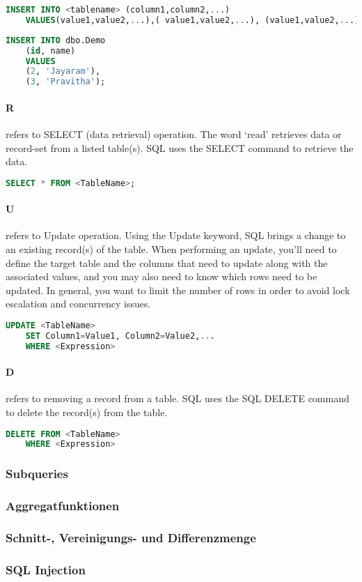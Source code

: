\begin{lstlisting}[language=SQL]
	INSERT INTO <tablename> (column1,column2,...) 
	VALUES(value1,value2,...),( value1,value2,...), (value1,value2,...)...
\end{lstlisting}

\begin{lstlisting}[language=SQL]
	INSERT INTO dbo.Demo
	(id, name)
	VALUES
	(2, 'Jayaram'),
	(3, 'Pravitha');
\end{lstlisting}

\paragraph{R} refers to SELECT (data retrieval) operation. The word ‘read’ retrieves data or record-set from a listed table(s). SQL uses the SELECT command to retrieve the data.

\begin{lstlisting}[language=SQL]
	SELECT * FROM <TableName>;
\end{lstlisting}

\paragraph{U} refers to Update operation. Using the Update keyword, SQL brings a change to an existing record(s) of the table. When performing an update, you’ll need to define the target table and the columns that need to update along with the associated values, and you may also need to know which rows need to be updated. In general, you want to limit the number of rows in order to avoid lock escalation and concurrency issues.

\begin{lstlisting}[language=SQL]
	UPDATE <TableName>
	SET Column1=Value1, Column2=Value2,...
	WHERE <Expression>
\end{lstlisting}

\paragraph{D} refers to removing a record from a table. SQL uses the SQL DELETE command to delete the record(s) from the table.

\begin{lstlisting}[language=SQL]
	DELETE FROM <TableName>
	WHERE <Expression>
\end{lstlisting}

\subsubsection{Subqueries}
\label{sec:Subquery}



\subsubsection{Aggregatfunktionen}
\label{sec:Aggregatfunktionen}

\subsubsection{Schnitt-, Vereinigungs- und Differenzmenge}
\label{sec:SchnittVereinigungsDifferenzmenge}

\subsubsection{SQL Injection}
\label{sec:SQLInjection}

